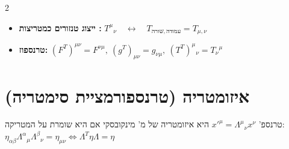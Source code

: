 \documentclass[10pt,a4paper]{article}
\begin{document}
\begin{multicols*}{2}
\begin{itemize}
\item \textbf{ייצוג טנזורים כמטריצות :}
$
T^\mu{}_\nu \quad \leftrightarrow \quad T_{\text{שורה}, \, \text{עמודה}} = T_{\mu, \nu}
$

\item \textbf{טרנספוז:}
$
    (F^T)^{\mu\nu} = F^{\nu\mu}, \ (g^T)_{\mu\nu} = g_{\nu\mu}, \ (T^T)^\mu{}_\nu = T_\nu{}^\mu
$

\end{itemize}

\section{איזומטריה (טרנספורמציית סימטריה)}
טרנספ' $x'^\mu = \Lambda^\mu{}_\nu x^\nu$ היא איזומטריה של מ' מינקובסקי אם היא שומרת על המטריקה:
$
\eta_{\alpha\beta} \Lambda^\alpha{}_\mu \Lambda^\beta{}_\nu = \eta_{\mu\nu} \Leftrightarrow \Lambda^T \eta \Lambda = \eta
$


\end{multicols*}
\end{document}
